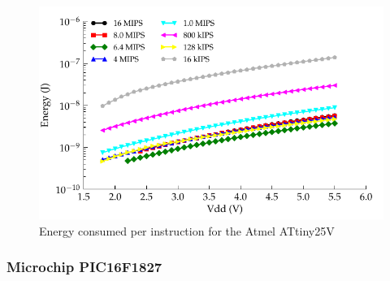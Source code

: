\begin{figure}
\begin{centering}
\includegraphics{content/appendices/microprocessorPowerMeasurements/graphics/Graph_ATtiny25V_Clock_JPI}
\par\end{centering}

\protect\caption{
\label{fig:ATtiny25VClkJPI}Energy consumed per instruction for the
Atmel ATtiny25V
}


\end{figure}



\subsubsection{Microchip PIC16F1827}

